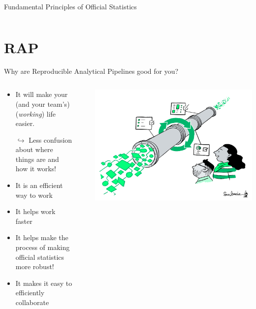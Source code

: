 \documentclass[xcolor=x11names,compress, aspectratio=169]{beamer}
\renewcommand{\(}{\begin{columns}}
\renewcommand{\)}{\end{columns}}
\newcommand{\<}[1]{\begin{column}{#1}}
\renewcommand{\>}{\end{column}}
\begin{document}
\begin{frame}{Fundamental Principles of Official Statistics}
\begin{columns}[T]
\begin{column}{0.4\textwidth}
    \end{column}
  \end{columns}
\end{frame}

\section{RAP}  %

\begin{frame}{Why are Reproducible Analytical Pipelines good for you?}
  \begin{columns}[T]
    \begin{column}{0.7\textwidth}
      \begin{itemize}[<+->]
        \item It will make your (and your team's) (\emph{working}) life easier.
         \item[$\hookrightarrow$]{ \small  Less confusion about where things are and how it works!}
        \item It is an efficient way to work
        \item It helps work faster
        \item It helps make the process of making official statistics more robust!
        \item It makes it easy to efficiently collaborate
      \end{itemize}
    \end{column}
    \begin{column}{0.3\textwidth}
    \begin{itemize}
        \item[] \includegraphics[width=1.0\textwidth]{ReusablePipeline.png}
    \end{itemize}
    \end{column}
  \end{columns}
\end{frame}
\end{document}

